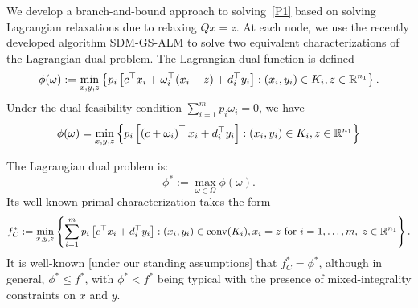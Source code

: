 We develop a branch-and-bound approach to solving~\eqref{P1} based on solving Lagrangian relaxations due to relaxing $Qx=z$.
At each node, we use the recently developed algorithm SDM-GS-ALM to solve two equivalent characterizations of the Lagrangian dual problem.
The Lagrangian dual function is defined 
$$\phi(\omega) := \min_{x,y,z} \left\{ p_i \left[ c^\top x_i + \omega_i^\top(x_i-z) + d_i^\top y_i \right] : (x_i,y_i) \in K_i, z \in \mathbb{R}^{n_1} \right \}.$$ 
Under the dual feasibility condition $\sum_{i=1}^m p_i \omega_i = 0$, we have 
$$\phi(\omega) = \min_{x,y,z} \left\{ p_i \left[ \left(c+\omega_i\right)^\top x_i + d_i^\top y_i \right] : (x_i,y_i) \in K_i, z \in \mathbb{R}^{n_1} \right \}$$ 



The Lagrangian dual problem is:
\begin{equation}\label{D1}
\phi^*:=\max_{\omega \in \Omega} \phi(\omega).
\end{equation}
Its well-known primal characterization takes the form
\begin{equation}\label{D2}
f_C^*:=\min_{x,y,z} \left\{ \sum_{i=1}^m p_i \left[ c^\top x_i + d_i^\top y_i \right] : (x_i,y_i) \in \operatorname{conv}(K_i),  x_i=z \text{ for }i=1,\dots,m,\; z \in \mathbb{R}^{n_1} \right \}.
\end{equation}
It is well-known [under our standing assumptions] that $f_C^*=\phi^*$, although in general, $\phi^* \le f^*$, with $\phi^* < f^*$ being typical with the presence of mixed-integrality constraints on $x$ and $y$.


